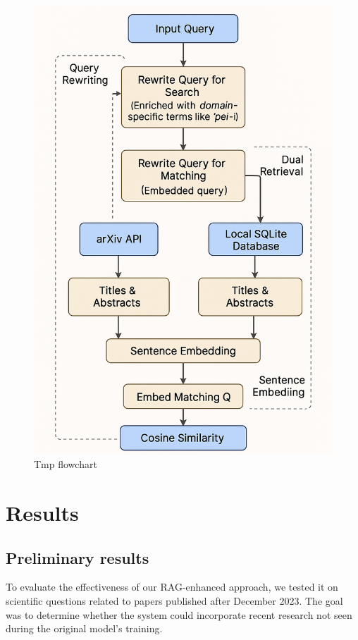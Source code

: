 \documentclass[fleqn,moreauthors,10pt]{ds_report}
\begin{document}
\begin{figure}[h]
    \centering
    \includegraphics[width=\linewidth]{fig/tmp.png}
    \caption{Tmp flowchart}
    \label{fig:retrieval_pipeline}
\end{figure}





\section*{Results}
\subsection*{Preliminary results }
To evaluate the effectiveness of our RAG-enhanced approach, we tested it on scientific
 questions related to papers published after December 2023. The goal was to determine 
 whether the system could incorporate recent research not seen during the original
  model’s training.
\end{document}
